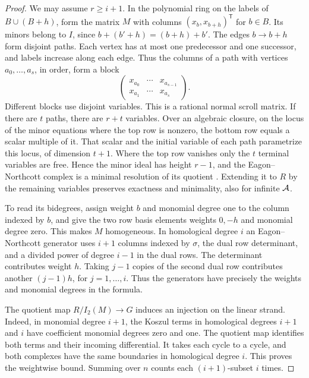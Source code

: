\begin{proof}
We may assume $r\ge i+1$. In the polynomial ring on the labels of
$B\cup(B+h)$, form the matrix $M$ with columns $(x_b,x_{b+h})^{\mathsf T}$
for $b\in B$. Its minors belong to $I$, since $b+(b'+h)=(b+h)+b'$.
The edges $b\to b+h$ form disjoint paths. Each vertex has at most one
predecessor and one successor, and labels increase along each edge.
Thus the columns of a path with vertices $a_0,\ldots,a_s$, in order,
form a block
\[
 \begin{pmatrix}x_{a_0}&\cdots&x_{a_{s-1}}\\
                 x_{a_1}&\cdots&x_{a_s}\end{pmatrix}.
\]
Different blocks use disjoint variables. This is a rational normal
scroll matrix. If there are $t$ paths, there are $r+t$ variables. Over
an algebraic closure, on the locus of the minor equations where the top row
is nonzero, the bottom row
equals a scalar multiple of it. That scalar and the initial variable
of each path parametrize this locus, of dimension $t+1$. Where the
top row vanishes only the $t$ terminal variables are free. Hence the
minor ideal has height $r-1$, and the Eagon--Northcott complex is a
minimal resolution of its quotient \cite{EN62}. Extending it to $R$ by the remaining
variables preserves exactness and minimality, also for infinite $\mathcal A$.

To read its bidegrees, assign weight $b$ and monomial degree one to the column
indexed by $b$, and give the two row basis elements weights $0,-h$
and monomial degree zero. This makes $M$ homogeneous. In homological degree $i$ an
Eagon--Northcott generator uses $i+1$ columns indexed by $\sigma$,
the dual row determinant, and a divided power of degree $i-1$ in
the dual rows. The determinant contributes weight $h$. Taking $j-1$
copies of the second dual row contributes another $(j-1)h$, for
$j=1,\ldots,i$. Thus the generators have precisely the weights and
monomial degrees in the formula.

The quotient map $R/I_2(M)\to G$ induces an injection on the linear
strand. Indeed, in monomial degree $i+1$, the Koszul terms in homological degrees
$i+1$ and $i$ have coefficient monomial degrees zero and one. The quotient map
identifies both terms and their incoming differential. It takes each
cycle to a cycle, and both complexes have the same boundaries in
homological degree $i$. This proves the weightwise bound. Summing over $n$
counts each $(i+1)$-subset $i$ times.
\end{proof}

